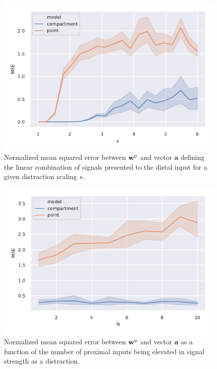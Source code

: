\documentclass[10pt,a4paper]{article}
\begin{document}
\begin{figure}
	\includegraphics[width=\textwidth]{./figures/distraction_scaling.pdf}
	\caption{Normalized mean squared error between $\mathbf{w}^{\rm p}$ and vector $\mathbf{a}$ defining the linear combination of signals presented to the distal input for a given distraction scaling $s$.}
	\label{fig:distraction_scaling}
\end{figure}

\begin{figure}
	\includegraphics[width=\textwidth]{./figures/distraction_inputs.pdf}
	\caption{Normalized mean squared error between $\mathbf{w}^{\rm p}$ and vector $\mathbf{a}$ as a function of the number of proximal inputs being elevated in signal strength as a distraction.}
	\label{fig:distraction_inputs}
\end{figure}
\end{document}
